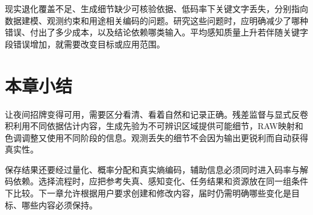 现实退化覆盖不足、生成细节缺少可核验依据、低码率下关键文字丢失，分别指向数据建模、观测约束和用途相关编码的问题。研究这些问题时，应明确减少了哪种错误、付出了多少成本，以及结论依赖哪类输入。平均感知质量上升若伴随关键字段错误增加，就需要改变目标或应用范围。

\section{本章小结}
\label{sec:vision-restoration-summary}

让夜间招牌变得可用，需要区分看清、看着自然和记录正确。残差监督与显式反卷积利用不同依据估计内容，生成先验为不可辨识区域提供可能细节，RAW映射和色调调整又使用不同阶段的信息。观测丢失的细节不会因为输出更锐利而自动获得真实性。

保存结果还要经过量化、概率分配和真实熵编码，辅助信息必须同时进入码率与解码依赖。选择流程时，应把参考失真、感知变化、任务结果和资源放在同一组条件下比较。下一章允许根据用户要求创建和修改内容，届时仍需明确哪些变化是目标、哪些内容必须保持。
